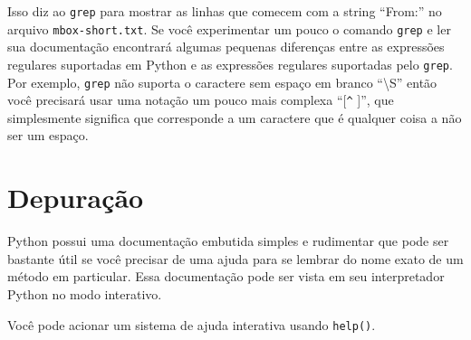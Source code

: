 Isso diz ao {\tt grep} para mostrar as linhas que comecem com a string
``From:'' no arquivo {\tt mbox-short.txt}. Se você experimentar um pouco
o comando {\tt grep} e ler sua documentação encontrará algumas pequenas
diferenças entre as expressões regulares suportadas em Python e as 
expressões regulares suportadas pelo {\tt grep}. Por exemplo, {\tt grep} não
suporta o caractere sem espaço em branco ``{\textbackslash}S'' então você
precisará usar uma notação um pouco mais complexa ``[\verb"^" ]'', que
simplesmente significa que corresponde a um caractere que é qualquer coisa
a não ser um espaço.

\section{Depuração}

Python possui uma documentação embutida simples e rudimentar que pode ser
bastante útil se você precisar de uma ajuda para se lembrar do nome exato
de um método em particular. Essa documentação pode ser vista em seu 
interpretador Python no modo interativo. 

Você pode acionar um sistema de ajuda interativa usando {\tt help()}.

